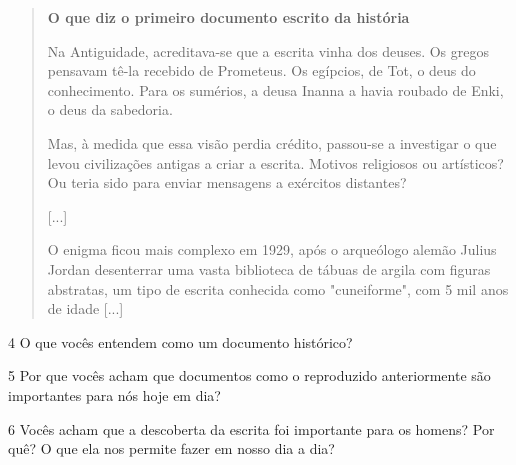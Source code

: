 \begin{itemize}
\begin{quote}
\textbf{O que diz o primeiro documento escrito da história}

Na Antiguidade, acreditava-se que a escrita vinha dos deuses. Os gregos
pensavam tê-la recebido de Prometeus. Os egípcios, de Tot, o deus do
conhecimento. Para os sumérios, a deusa Inanna a havia roubado de Enki,
o deus da sabedoria. 

Mas, à medida que essa visão perdia crédito,
passou-se a investigar o que levou civilizações antigas a criar a escrita. Motivos religiosos ou artísticos? Ou teria sido para enviar mensagens a exércitos distantes?

[...]

O enigma ficou mais complexo em 1929, após o arqueólogo alemão Julius Jordan desenterrar uma vasta biblioteca de tábuas de argila com figuras abstratas, um tipo de escrita conhecida como "cuneiforme", com 5 mil anos de idade [...]

\end{quote}

\num{4} O que vocês entendem como um documento histórico?


\num{5} Por que vocês acham que documentos como o reproduzido anteriormente são
importantes para nós hoje em dia?


\num{6} Vocês acham que a descoberta da escrita foi importante para os homens?
Por quê? O que ela nos permite fazer em nosso dia a dia?



\end{itemize}
